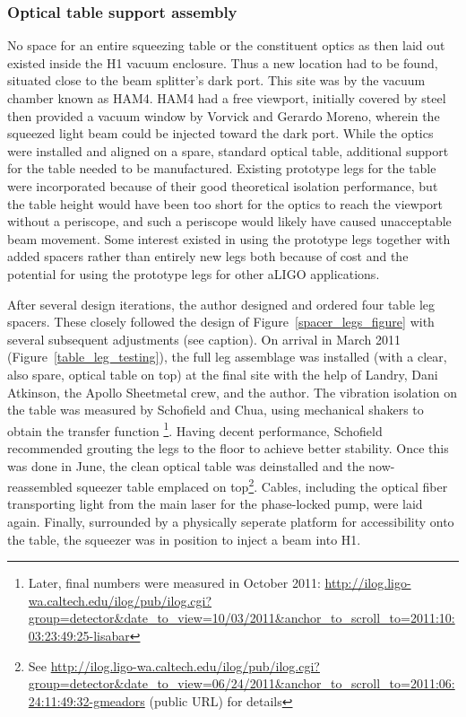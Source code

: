 
            \subsubsection{Optical table support assembly}
            \label{table_legs}

No space for an entire squeezing table or the constituent optics as then laid out existed inside the H1 vacuum enclosure.
Thus a new location had to be found, situated close to the beam splitter's dark port.
This site was by the vacuum chamber known as HAM4.
HAM4 had a free viewport, initially covered by steel then provided a vacuum window by Vorvick and Gerardo Moreno, wherein the squeezed light beam could be injected toward the dark port.
While the optics were installed and aligned on a spare, standard optical table, additional support for the table needed to be manufactured.
Existing prototype legs for the table were incorporated because of their good theoretical isolation performance, but the table height would have been too short for the optics to reach the viewport without a periscope, and such a periscope would likely have caused unacceptable beam movement. 
Some interest existed in using the prototype legs together with added spacers rather than entirely new legs both because of cost and the potential for using the prototype legs for other aLIGO applications.

After several design iterations, the author designed and ordered four table leg spacers. These closely followed the design of Figure~\ref{spacer_legs_figure} with several subsequent adjustments (see caption).
On arrival in March 2011 (Figure~\ref{table_leg_testing}), the full leg assemblage was installed (with a clear, also spare, optical table on top) at the final site with the help of Landry, Dani Atkinson, the Apollo Sheetmetal crew, and the author.
The vibration isolation on the table was measured by Schofield and Chua, using mechanical shakers to obtain the transfer function \footnote{Later, final numbers were measured in October 2011: \url{http://ilog.ligo-wa.caltech.edu/ilog/pub/ilog.cgi?group=detector&date_to_view=10/03/2011&anchor_to_scroll_to=2011:10:03:23:49:25-lisabar}}.
Having decent performance, Schofield recommended grouting the legs to the floor to achieve better stability.
Once this was done in June, the clean optical table was deinstalled and the now-reassembled squeezer table emplaced on top\footnote{See \url{http://ilog.ligo-wa.caltech.edu/ilog/pub/ilog.cgi?group=detector&date_to_view=06/24/2011&anchor_to_scroll_to=2011:06:24:11:49:32-gmeadors} (public URL) for details}.
Cables, including the optical fiber transporting light from the main laser for the phase-locked pump, were laid again.
Finally, surrounded by a physically seperate platform for accessibility onto the table, the squeezer was in position to inject a beam into H1.



